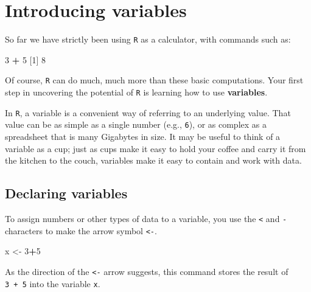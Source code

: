 \documentclass[]{book}
\newenvironment{Shaded}{\begin{snugshade}}{\end{snugshade}}
\newcommand{\DecValTok}[1]{\textcolor[rgb]{0.00,0.00,0.81}{#1}}
\newcommand{\NormalTok}[1]{#1}
\newcommand{\OperatorTok}[1]{\textcolor[rgb]{0.81,0.36,0.00}{\textbf{#1}}}
\newcommand{\StringTok}[1]{\textcolor[rgb]{0.31,0.60,0.02}{#1}}
\begin{document}
\hypertarget{introducing-variables}{%
\section*{Introducing variables}\label{introducing-variables}}

So far we have strictly been using \texttt{R} as a calculator, with commands such as:

\begin{Shaded}
\begin{Highlighting}[]
\DecValTok{3} \OperatorTok{+}\StringTok{ }\DecValTok{5}
\NormalTok{[}\DecValTok{1}\NormalTok{] }\DecValTok{8}
\end{Highlighting}
\end{Shaded}

Of course, \texttt{R} can do much, much more than these basic computations. Your first step in uncovering the potential of \texttt{R} is learning how to use \textbf{variables}.

In \texttt{R}, a variable is a convenient way of referring to an underlying value. That value can be as simple as a single number (e.g., \texttt{6}), or as complex as a spreadsheet that is many Gigabytes in size. It may be useful to think of a variable as a cup; just as cups make it easy to hold your coffee and carry it from the kitchen to the couch, variables make it easy to contain and work with data.

\hypertarget{declaring-variables}{%
\subsection*{Declaring variables}\label{declaring-variables}}

To assign numbers or other types of data to a variable, you use the \texttt{\textless{}} and \texttt{-} characters to make the arrow symbol \texttt{\textless{}-}.

\begin{Shaded}
\begin{Highlighting}[]
\NormalTok{x <-}\StringTok{ }\DecValTok{3}\OperatorTok{+}\DecValTok{5}
\end{Highlighting}
\end{Shaded}

As the direction of the \texttt{\textless{}-} arrow suggests, this command stores the result of \texttt{3\ +\ 5} into the variable \texttt{x}.
\end{document}
